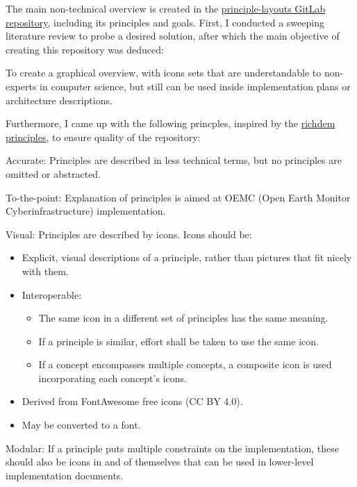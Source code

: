 \documentclass[journal, dvipsnames]{IEEEtran}
\begin{document}
The main non-technical overview is created in the \href{https://gitlab.opengeohub.org/fee.gevaert/principle-layouts}{principle-layouts GitLab repository}, including its principles and goals. First, I conducted a sweeping literature review to probe a desired solution, after which the main objective of creating this repository was deduced:
\begin{displayquote}
To create a graphical overview, with icons sets that are understandable to non-experts
in computer science, but still can be used inside implementation plans or architecture
descriptions.
\end{displayquote}
Furthermore, I came up with the following princples, inspired by the \href{https://github.com/r-barnes/richdem#design-philosophy}{richdem principles}, to ensure quality of the repository:
\begin{LaTeXdescription}
  \item[Accurate:] Principles are described in less technical terms, but no principles are omitted or abstracted.
  \item[To-the-point:] Explanation of principles is aimed at OEMC (Open Earth Monitor Cyberinfrastructure) implementation.
  \item[Visual:] Principles are described by icons. Icons should be:
  \begin{itemize}
    \item Explicit, visual descriptions of a principle, rather than pictures that fit nicely with them.
    \item Interoperable:
    \begin{itemize}
      \item The same icon in a different set of principles has the same meaning.
      \item If a principle is similar, effort shall be taken to use the same icon.
      \item If a concept encompasses multiple concepts, a composite icon is used incorporating each concept's icons.
    \end{itemize}
    \item Derived from FontAwesome free icons (CC BY 4.0).
    \item May be converted to a font.
  \end{itemize}
  \item[Modular:] If a principle puts multiple constraints on the implementation, these should also be icons in and of themselves that can be used in lower-level implementation documents.
\end{LaTeXdescription}
\end{document}
